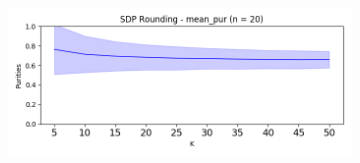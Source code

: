 \documentclass{article}
\begin{document}
\begin{figure}[h!]
\begin{subfigure}[t]{0.5\textwidth}
            \caption{}
        \end{subfigure}%
        ~ 
        \begin{subfigure}[t]{0.5\textwidth}
            \centering
            \includegraphics[width=\textwidth]{mean_pur_20n_false}
            \caption{}
        \end{subfigure}
    \end{figure}
\end{document}
